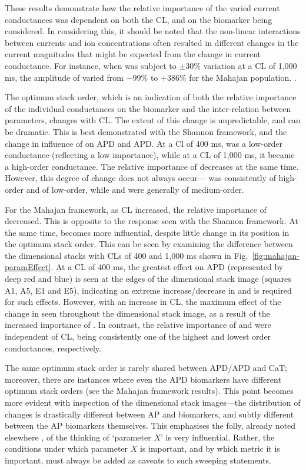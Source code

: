 \documentclass[../thesis-main.tex]{subfiles}
\begin{document}
These results demonstrate how the relative importance of the varied current conductances was dependent on both the CL, and on the biomarker being considered. In considering this, it should be noted that the non-linear interactions between currents and ion concentrations often resulted in different changes in the current magnitudes that might be expected from the change in current conductance. For instance, when \gks{} was subject to $\pm30\%$ variation at a CL of 1,000 ms, the amplitude of \iks{} varied from $-99\%$ to $+386\%$ for the Mahajan population. .

The optimum stack order, which is an indication of both the relative importance of the individual conductances on the biomarker and the inter-relation between parameters, changes with CL. The extent of this change is unpredictable, and can be dramatic. This is best demonstrated with the Shannon framework, and the change in influence of \gto{} on APD and APD. At a Cl of 400 ms, \gto{} was a low-order conductance (reflecting a low importance), while at a CL of 1,000 ms, it became a high-order conductance. The relative importance of \gkix{} decreases at the same time. However, this degree of change does not always occur---\gca{} was consistently of high-order and \gks{} of low-order, while \gkr{} and \gnak{} were generally of medium-order.

For the Mahajan framework, as CL increased, the relative importance of \gto{} decreased. This is opposite to the response seen with the Shannon framework. At the same time, \gks{} becomes more influential, despite little change in its position in the optimum stack order. This can be seen by examining the difference between the dimensional stacks with CLs of 400 and 1,000 ms shown in Fig.~\ref{fig:mahajan-paramEffect}. At a CL of 400 ms, the greatest effect on APD (represented by deep red and blue) is seen at the edges of the dimensional stack image (squares A1, A5, E1 and E5), indicating an extreme increase/decrease in \gca{} and \gnak{} is required for such effects. However, with an increase in CL, the maximum effect of the change in seen throughout the dimensional stack image, as a result of the increased importance of \gks{}. In contrast, the relative importance of \gnak{} and \gkr{} were independent of CL, being consistently one of the highest and lowest order conductances, respectively.

The same optimum stack order is rarely shared between APD/APD and CaT; moreover, there are instances where even the APD biomarkers have different optimum stack orders (see the Mahajan framework results). This point becomes more evident with inspection of the dimensional stack images---the distribution of changes is drastically different between AP and \cai{} biomarkers, and subtly different between the AP biomarkers themselves. This emphasises the folly, already noted elsewhere \citep{Walmsley2013}, of the thinking of `parameter $X$' is very influential. Rather, the conditions under which parameter $X$ is important, and by which metric it is important, must always be added as caveats to such sweeping statements.
\end{document}

